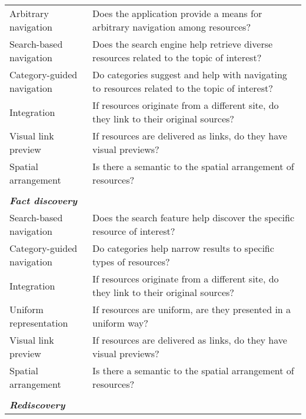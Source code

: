 {\begin{table*}[htbp]
\begin{tabular}{|p{0.28\linewidth}|p{0.72\linewidth}|}
Arbitrary navigation         & Does the application provide a means for arbitrary navigation among resources?                              \\
Search-based navigation      & Does the search engine help retrieve diverse resources related to the topic of interest?               \\
Category-guided navigation & Do categories suggest and help with navigating to resources related to the topic of interest?           \\
Integration                  & If resources originate from a different site, do they link to their original sources?                   \\
Visual link preview               & If resources are delivered as links, do they have visual previews?                                                                        \\
Spatial arrangement          & Is there a semantic to the spatial arrangement of resources?                                                    \\
&\\
\emph{\textbf{Fact discovery}}                &                                                                                                           \\
Search-based navigation      & Does the search feature help discover the specific resource of interest?                                  \\
Category-guided navigation & Do categories help narrow results to specific types of resources?                                   \\
Integration                  & If resources originate from a different site, do they link to their original sources?                   \\
Uniform representation       & If resources are uniform, are they presented in a uniform way? \\
Visual link preview               & If resources are delivered as links, do they have visual previews?                                                                        \\
Spatial arrangement          & Is there a semantic to the spatial arrangement of resources?                                                    \\
&\\
\emph{\textbf{Rediscovery}}                     &                                                                                                           \\

\end{tabular}
\end{table*}}
